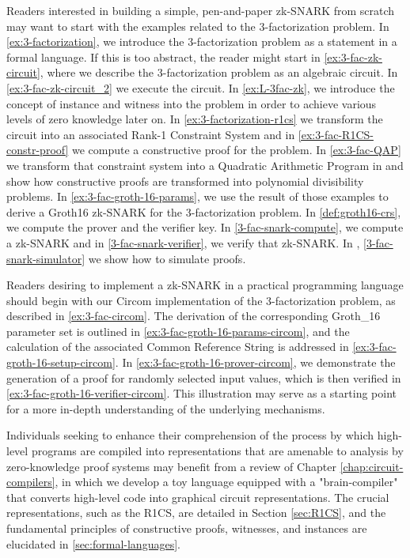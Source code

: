 Readers interested in building a simple, pen-and-paper zk-SNARK from scratch may want to start with the examples related to the 3-factorization problem. In \examplename{} \ref{ex:3-factorization}, we introduce the 3-factorization problem as a statement in a formal language. If this is too abstract, the reader might start in \examplename{} \ref{ex:3-fac-zk-circuit}, where we describe the 3-factorization problem as an algebraic circuit. In \examplename{} \ref{ex:3-fac-zk-circuit_2} we execute the circuit. In \examplename{} \ref{ex:L-3fac-zk}, we introduce the concept of instance and witness into the problem in order to achieve various levels of zero knowledge later on. In \examplename{} \ref{ex:3-factorization-r1cs} we transform the circuit into an associated Rank-1 Constraint System and in \examplename{} \ref{ex:3-fac-R1CS-constr-proof} we compute a constructive proof for the problem. In \examplename{} \ref{ex:3-fac-QAP} we transform that constraint system into a Quadratic Arithmetic Program in and show how constructive proofs are transformed into polynomial divisibility problems. In \examplename{} \ref{ex:3-fac-groth-16-params}, we  use the result of those examples to derive a Groth16 zk-SNARK for the 3-factorization problem. In \ref{def:groth16-crs}, we compute the prover and the verifier key. In \examplename{} \ref{3-fac-snark-compute}, we compute a zk-SNARK and in \examplename{} \ref{3-fac-snark-verifier}, we verify that zk-SNARK. In \examplename{}, \ref{3-fac-snark-simulator} we show how to simulate proofs. 

Readers desiring to implement a zk-SNARK in a practical programming language should begin with our Circom implementation of the 3-factorization problem, as described in \ref{ex:3-fac-circom}. The derivation of the corresponding Groth\_16 parameter set is outlined in \ref{ex:3-fac-groth-16-params-circom}, and the calculation of the associated Common Reference String is addressed in \ref{ex:3-fac-groth-16-setup-circom}. In \ref{ex:3-fac-groth-16-prover-circom}, we demonstrate the generation of a proof for randomly selected input values, which is then verified in \ref{ex:3-fac-groth-16-verifier-circom}. This illustration may serve as a starting point for a more in-depth understanding of the underlying mechanisms.

Individuals seeking to enhance their comprehension of the process by which high-level programs are compiled into representations that are amenable to analysis by zero-knowledge proof systems may benefit from a review of Chapter \ref{chap:circuit-compilers}, in which we develop a toy language equipped with a "brain-compiler" that converts high-level code into graphical circuit representations. The crucial representations, such as the R1CS, are detailed in Section \ref{sec:R1CS}, and the fundamental principles of constructive proofs, witnesses, and instances are elucidated in \ref{sec:formal-languages}.



